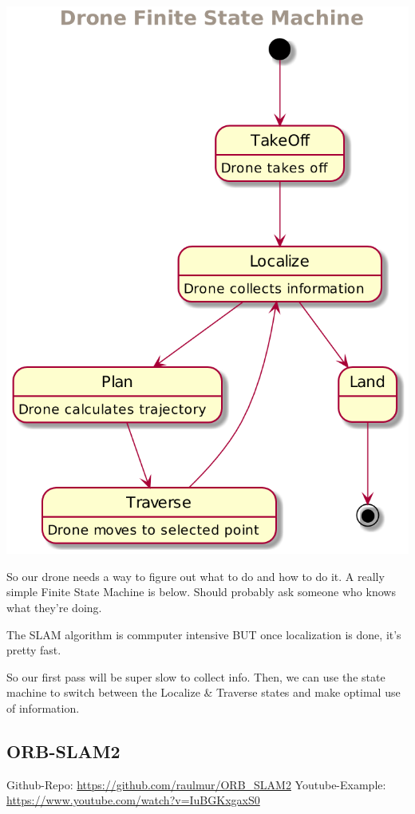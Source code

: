 \documentclass[unrestricted]{meetingnotesminutes}
\begin{document}
\begin{center}
\includegraphics[width=.9\linewidth]{drone-fsm.png}
\end{center}

So our drone needs a way to figure out what to do and how to do it.
A really simple Finite State Machine is below. Should probably ask someone who knows what they're doing.

The SLAM algorithm is commputer intensive BUT once localization is done, it's pretty fast.

So our first pass will be super slow to collect info.
Then, we can use the state machine to switch between the Localize \& Traverse states and make optimal use of information.

\subsection{ORB-SLAM2}
\label{sec:orgdfffd46}


Github-Repo: \url{https://github.com/raulmur/ORB\_SLAM2}
Youtube-Example: \url{https://www.youtube.com/watch?v=IuBGKxgaxS0}
\end{document}
